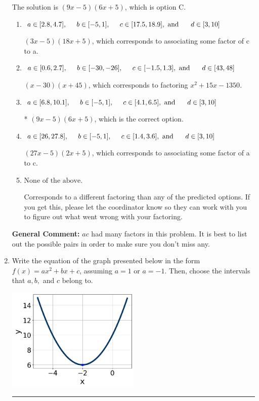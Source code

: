 \documentclass{extbook}[14pt]
\newcommand{\litem}[1]{\item #1

\rule{\textwidth}{0.4pt}}
\begin{document}
\begin{enumerate}
{The solution is \( (9x -5)(6x + 5) \), which is option C.\begin{enumerate}[label=\Alph*.]
\item \( a \in [2.8, 4.7], \hspace*{5mm} b \in [-5, 1], \hspace*{5mm} c \in [17.5, 18.9], \text{ and } \hspace*{5mm} d \in [3, 10] \)

 $(3x -5)(18x + 5)$, which corresponds to associating some factor of c to a.
\item \( a \in [0.6, 2.7], \hspace*{5mm} b \in [-30, -26], \hspace*{5mm} c \in [-1.5, 1.3], \text{ and } \hspace*{5mm} d \in [43, 48] \)

 $(x -30)(x + 45)$, which corresponds to factoring $x^{2} +15 x -1350$.
\item \( a \in [6.8, 10.1], \hspace*{5mm} b \in [-5, 1], \hspace*{5mm} c \in [4.1, 6.5], \text{ and } \hspace*{5mm} d \in [3, 10] \)

* $(9x -5)(6x + 5)$, which is the correct option.
\item \( a \in [26, 27.8], \hspace*{5mm} b \in [-5, 1], \hspace*{5mm} c \in [1.4, 3.6], \text{ and } \hspace*{5mm} d \in [3, 10] \)

 $(27x -5)(2x + 5)$, which corresponds to associating some factor of a to c.
\item \( \text{None of the above.} \)

 Corresponds to a different factoring than any of the predicted options. If you get this, please let the coordinator know so they can work with you to figure out what went wrong with your factoring.
\end{enumerate}

\textbf{General Comment:} $ac$ had many factors in this problem. It is best to list out the possible pairs in order to make sure you don't miss any.
}
\litem{
Write the equation of the graph presented below in the form $f(x)=ax^2+bx+c$, assuming  $a=1$ or $a=-1$. Then, choose the intervals that $a, b,$ and $c$ belong to.

\begin{center}
    \includegraphics[width=0.5\textwidth]{../Figures/quadraticGraphToEquationCopyB.png}
\end{center}




}
\end{enumerate}
\end{document}
